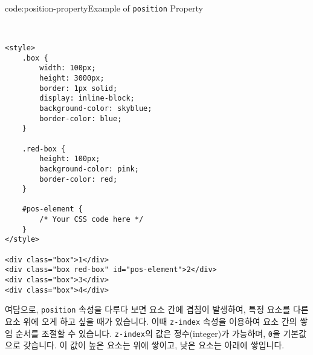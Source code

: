 \begin{codeenv}{code:position-property}{Example of \texttt{position} Property}\begin{verbatim}


<style>
    .box {
        width: 100px;
        height: 3000px;
        border: 1px solid;
        display: inline-block;
        background-color: skyblue;
        border-color: blue;
    }

    .red-box {
        height: 100px;
        background-color: pink;
        border-color: red;
    }

    #pos-element {
        /* Your CSS code here */
    }
</style>

<div class="box">1</div>
<div class="box red-box" id="pos-element">2</div>
<div class="box">3</div>
<div class="box">4</div>
\end{verbatim}
\end{codeenv}

여담으로, \texttt{position} 속성을 다루다 보면 요소 간에 겹침이 발생하여, 특정 요소를 다른 요소 위에 오게 하고 싶을 때가 있습니다. 이때 \texttt{z-index} 속성을 이용하여 요소 간의 쌓임 순서를 조절할 수 있습니다. \texttt{z-index}의 값은 정수(integer)가 가능하며, \texttt{0}을 기본값으로 갖습니다. 이 값이 높은 요소는 위에 쌓이고, 낮은 요소는 아래에 쌓입니다. 
